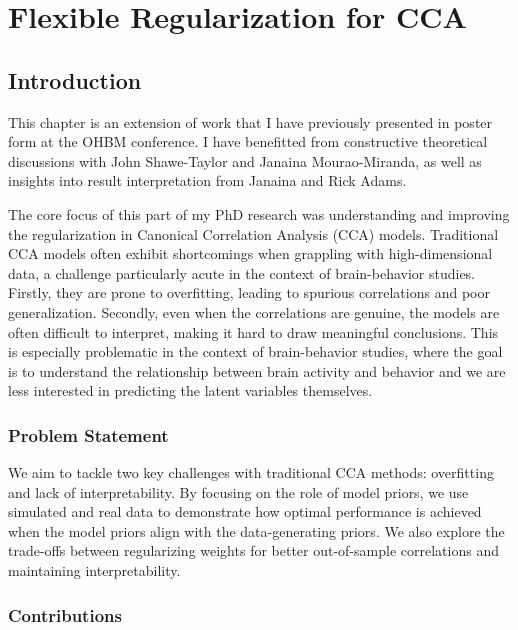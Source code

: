\chapter{Flexible Regularization for CCA}
\label{chap:als}
\minitoc

\section{Introduction}\label{sec:introduction}

This chapter is an extension of work that I have previously presented in poster form at the OHBM conference.
I have benefitted from constructive theoretical discussions with John Shawe-Taylor and Janaina Mourao-Miranda, as well as insights into result interpretation from Janaina and Rick Adams.

The core focus of this part of my PhD research was understanding and improving the regularization in Canonical Correlation Analysis (CCA) models.
Traditional CCA models often exhibit shortcomings when grappling with high-dimensional data, a challenge particularly acute in the context of brain-behavior studies.
Firstly, they are prone to overfitting, leading to spurious correlations and poor generalization.
Secondly, even when the correlations are genuine, the models are often difficult to interpret, making it hard to draw meaningful conclusions. This is especially problematic in the context of brain-behavior studies, where the goal is to understand the relationship between brain activity and behavior and we are less interested in predicting the latent variables themselves.

\subsection{Problem Statement}\label{subsec:problem-statement}

We aim to tackle two key challenges with traditional CCA methods: overfitting and lack of interpretability. By focusing on the role of model priors, we use simulated and real data to demonstrate how optimal performance is achieved when the model priors align with the data-generating priors. We also explore the trade-offs between regularizing weights for better out-of-sample correlations and maintaining interpretability.

\subsection{Contributions}\label{subsec:contributions}

